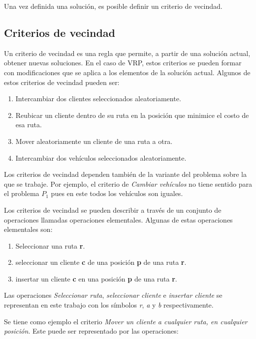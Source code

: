 Una vez definida una solución, es posible definir un criterio de vecindad.


\subsection{Criterios de vecindad}\label{2-criteria}
Un criterio de vecindad es una regla que permite, a partir de una solución actual, obtener nuevas soluciones. En el caso de VRP, estos criterios se pueden formar con modificaciones que se aplica a los elementos de la solución actual. Algunos de estos criterios de vecindad \cite{Camila}\cite{Daniela} pueden ser: 

\begin{enumerate}
	\item Intercambiar dos clientes seleccionados aleatoriamente.
	\item Reubicar un cliente dentro de su ruta en la posición que minimice el costo de esa ruta.
	\item Mover aleatoriamente un cliente de una ruta a otra.
	\item Intercambiar dos vehículos seleccionados aleatoriamente.
\end{enumerate}

Los criterios de vecindad dependen también de la variante del problema sobre la que se trabaje. Por ejemplo, el criterio de \textit{Cambiar vehículos} no tiene sentido para el problema $P_1$ pues en este todos los vehículos son iguales.

Los criterios de vecindad se pueden describir a través de un conjunto de operaciones llamadas operaciones elementales. Algunas de estas operaciones elementales son:

\begin{enumerate}
	\item Seleccionar una ruta \textbf{r}. 
	\item seleccionar un cliente \textbf{c} de una posición \textbf{p} de una ruta \textbf{r}.
	\item insertar un cliente \textbf{c} en una posición \textbf{p} de una ruta \textbf{r}.
\end{enumerate}

Las operaciones \textit{Seleccionar ruta}, \textit{seleccionar cliente} e \textit{insertar cliente} se representan en este trabajo con los símbolos \textit{r}, \textit{a} y \textit{b} respectivamente.

Se tiene como ejemplo el criterio \textit{Mover un cliente a cualquier ruta, en cualquier posición}. Este puede ser representado por las operaciones:

